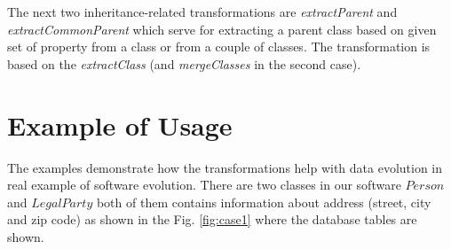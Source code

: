 \documentclass[runningheads]{comsis}
\begin{document}
The next two inheritance-related transformations are \emph{extractParent} and \emph{extractCommonParent} which serve for extracting a parent class based on given set of property from a class or from a couple of classes. The transformation is based on the \emph{extractClass} (and \emph{mergeClasses} in the second case). 




\section{Example of Usage}
The examples demonstrate how the transformations help with data evolution in real example of software evolution. There are two classes in our software $Person$ and $LegalParty$ both of them contains information about address (street, city and zip code) as shown in the Fig. \ref{fig:case1} where the database tables are shown. 
\end{document}
